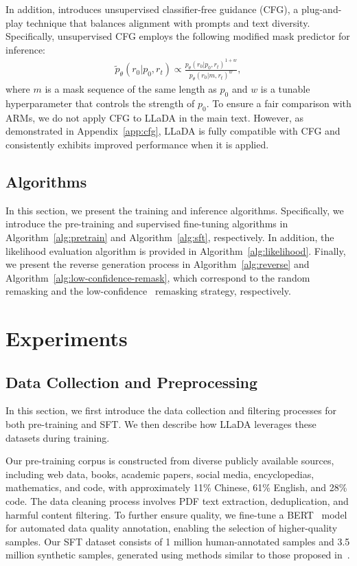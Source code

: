 \documentclass{article}
\begin{document}
In addition, \citet{nie2024scaling} introduces unsupervised classifier-free guidance (CFG), a plug-and-play technique that balances alignment with prompts and text diversity. Specifically, unsupervised CFG employs the following modified mask predictor for inference:
\begin{align}
    \tilde{p}_{\theta}(r_0| p_0, r_t ) \propto \frac{p_{\theta}(r_0| p_0, r_t)^{1+w}}{p_{\theta}(r_0|m, r_t)^w},
\end{align}
where $m$ is a mask sequence of the same length as $p_0$ and $w$ is a tunable hyperparameter that controls the strength of $p_0$. To ensure a fair comparison with ARMs, we do not apply CFG to LLaDA in the main text. However, as demonstrated in Appendix~\ref{app:cfg}, LLaDA is fully compatible with CFG and consistently exhibits improved performance when it is applied.

\subsection{Algorithms}
\label{app:algorithms}
In this section, we present the training and inference algorithms. Specifically, we introduce the pre-training and supervised fine-tuning algorithms in Algorithm~\ref{alg:pretrain} and Algorithm~\ref{alg:sft}, respectively. In addition, the likelihood evaluation algorithm is provided in Algorithm~\ref{alg:likelihood}. Finally, we present the reverse generation process in Algorithm~\ref{alg:reverse} and Algorithm~\ref{alg:low-confidence-remask}, which correspond to the random remasking and the low-confidence~\citep{chang2022maskgit} remasking strategy, respectively.

\section{Experiments}
\label{app:experiment}

\subsection{Data Collection and Preprocessing}
\label{app:data}
In this section, we first introduce the data collection and filtering processes for both pre-training and SFT. We then describe how LLaDA leverages these datasets during training.

Our pre-training corpus is constructed from diverse publicly available sources, including web data, books, academic papers, social media, encyclopedias, mathematics, and code, with approximately 11\% Chinese, 61\% English, and 28\% code. The data cleaning process involves PDF text extraction, deduplication, and harmful content filtering. To further ensure quality, we fine-tune a BERT~\citep{devlin2018bert} model for automated data quality annotation, enabling the selection of higher-quality samples. Our SFT dataset consists of 1 million human-annotated samples and 3.5 million synthetic samples, generated using methods similar to those proposed in~\citet{xu2024magpie, wei2023magicoder}.
\end{document}
